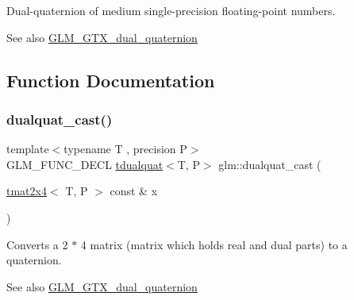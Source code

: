 Dual-\/quaternion of medium single-\/precision floating-\/point numbers.

\begin{DoxySeeAlso}{See also}
\hyperlink{group__gtx__dual__quaternion}{G\+L\+M\+\_\+\+G\+T\+X\+\_\+dual\+\_\+quaternion} 
\end{DoxySeeAlso}


\subsection{Function Documentation}
\mbox{\label{group__gtx__dual__quaternion_gada9799afe2b62394dc498534beb5bc78}} 
\subsubsection{\texorpdfstring{dualquat\+\_\+cast()}{dualquat\_cast()}\hspace{0.1cm}{\footnotesize\ttfamily [1/2]}}
{\footnotesize\ttfamily template$<$typename T , precision P$>$ \\
G\+L\+M\+\_\+\+F\+U\+N\+C\+\_\+\+D\+E\+CL \hyperlink{structglm_1_1tdualquat}{tdualquat}$<$T, P$>$ glm\+::dualquat\+\_\+cast (\begin{DoxyParamCaption}\item[{\hyperlink{structglm_1_1tmat2x4}{tmat2x4}$<$ T, P $>$ const \&}]{x }\end{DoxyParamCaption})}

Converts a 2 $\ast$ 4 matrix (matrix which holds real and dual parts) to a quaternion.

\begin{DoxySeeAlso}{See also}
\hyperlink{group__gtx__dual__quaternion}{G\+L\+M\+\_\+\+G\+T\+X\+\_\+dual\+\_\+quaternion} 
\end{DoxySeeAlso}
\mbox{\label{group__gtx__dual__quaternion_ga20eb5758beb73cc6dbc2d9104f03ec20}} 
